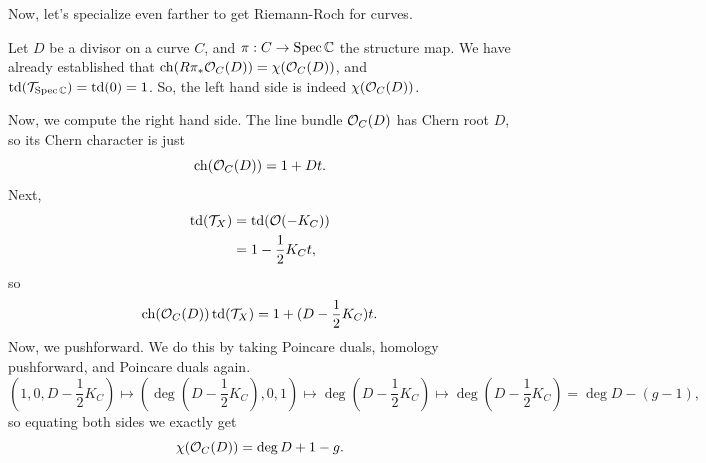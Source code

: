 \documentclass[12pt]{article}
\DeclareMathOperator{\chern}{ch}
\DeclareMathOperator{\todd}{td}
\begin{document}
Now, let's specialize even farther to get Riemann-Roch for curves.

\begin{eg}
    Let $D$ be a divisor on a curve $C$, and $\pi:C\to \operatorname{Spec}\mathbb{C}$ the structure map. We have already established that $\chern(R\pi_* \cO_C(D)) = \chi(\cO_C(D))$, and $\todd(\cT_{\Spec \C})=\todd(0)=1$. So, the left hand side is indeed $\chi(\mathcal{O}_C(D))$.

    Now, we compute the right hand side. The line bundle $\mathcal{O}_C(D)$ has Chern root $D$, so its Chern character is just
    \[\chern(\cO_C(D)) = 1+Dt.\]
    Next,
    \begin{align*}
        \todd(\cT_X) &= \todd(\cO(-K_C))\\
        &= 1 -\frac{1}{2}K_C t,
    \end{align*}
    so
    \[\chern(\cO_C(D))\todd(\cT_X) = 1 + (D-\frac{1}{2}K_C)t.\]
    Now, we pushforward. We do this by taking Poincare duals, homology pushforward, and Poincare duals again.
    \[(1,0,D-\frac{1}{2}K_C) \mapsto (\deg(D-\frac{1}{2}K_C),0,1) \mapsto \deg(D-\frac{1}{2}K_C) \mapsto \deg(D-\frac{1}{2}K_C) = \deg D - (g-1),\]
    so equating both sides we exactly get
    \[\chi(\mathcal{O}_C(D)) = \deg D + 1 - g.\]
\end{eg}
\end{document}
